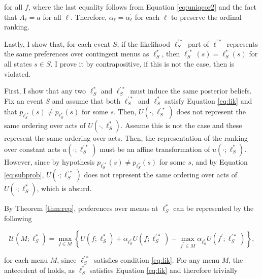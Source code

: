 \begin{corproof}
	for all \( f \), where the last equality follows from Equation \eqref{eq:uniqcor2} and the fact that \( A_{\ell} = a \) for all \( \ell \). Therefore, \( \alpha_{\ell} = \alpha^{\prime}_{\ell} \) for each \( \ell \) to preserve the ordinal ranking.

	Lastly, I show that, for each event \( S \), if the likelihood \( \ell^{\prime *}_S \) part of \( \ell^{\prime *} \) represents the same preferences over contingent menus as \( \ell^{*}_S \), then \( \ell_{S}^{\prime *} \left( s \right) = \ell_{S}^{*} \left( s \right) \) for all states \( s \in S \). I prove it by contrapositive, if this is not the case, then  is violated.

	First, I show that any two \( \ell_{S}^{*} \) and \( \ell_{S}^{\prime *} \) must induce the same posterior beliefs. Fix an event \( S \) and assume that both \( \ell^{\prime *}_S \) and \( \ell^{*}_S \) satisfy Equation \eqref{eq:lik} and that \( p_{\ell_{S}^{\prime *}}  \left( s \right) \neq p_{\ell_{S}^{*}}  \left( s \right) \) for some \( s \). Then, \( U \left( \cdot, \ell_{S}^{\prime *} \right) \) does not represent the same ordering over acts of \( U \left( \cdot, \ell^{*}_S \right) \). Assume this is not the case and these represent the same ordering over acts. Then, the representation of the ranking over constant acts \( u \left( \cdot; \ell_{S}^{\prime *} \right) \) must be an affine transformation of \( u \left( \cdot; \ell^{*}_S \right) \). However, since by hypothesis \( p_{\ell_{S}^{\prime *}} \left( s \right) \neq p_{\ell_{S}^{*}} \left( s \right) \) for some \( s \), and by Equation \eqref{eq:subprob}, \( U \left( \cdot; \ell_{S}^{\prime *} \right) \) does not represent the same ordering over acts of \( U \left( \cdot; \ell^{*}_S \right) \), which is absurd.

	By Theorem \ref{thm:rep}, preferences over menus at \( \ell_S^{ *} \) can be represented by the following

	\[
		\mathcal{U} \left( M ; \ell_{S}^{*} \right) = \max _{f \in M}\left\{U \left( f ; \ell_S^{ *} \right) + \alpha_{\ell_S^{ *}} U \left(f ; \ell_S^{\prime *} \right) - \max _{f^{\prime} \in M} \alpha_{\ell_S^{ *}} U \left(f^{\prime} ; \ell_S^{\prime *} \right) \right\} ,
	\]

	for each menu \( M \), since \( \ell_S^{\prime *} \) satisfies condition \eqref{eq:lik}. For any menu \( M \), the antecedent of  holds, as \( \ell_{S}^{ *} \) satisfies Equation \eqref{eq:lik} and therefore trivially


\end{corproof}
